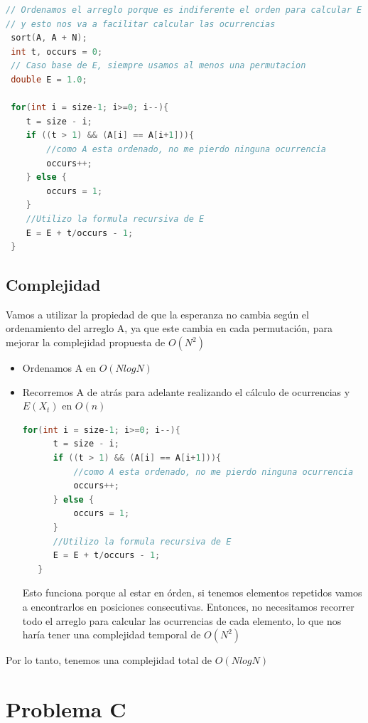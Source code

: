 \documentclass[a4paper]{article}
\begin{document}
\begin{lstlisting}[language=c++]
// Ordenamos el arreglo porque es indiferente el orden para calcular E
// y esto nos va a facilitar calcular las ocurrencias 
 sort(A, A + N); 
 int t, occurs = 0;
 // Caso base de E, siempre usamos al menos una permutacion
 double E = 1.0;
 
 for(int i = size-1; i>=0; i--){
    t = size - i;
    if ((t > 1) && (A[i] == A[i+1])){
        //como A esta ordenado, no me pierdo ninguna ocurrencia
    	occurs++;
    } else {
  	    occurs = 1;
    }
    //Utilizo la formula recursiva de E
    E = E + t/occurs - 1;
 }
\end{lstlisting}
\newpage
\subsection{Complejidad}
Vamos a utilizar la propiedad de que la esperanza no cambia según el ordenamiento del arreglo A, ya que este cambia en cada permutación, para mejorar la complejidad propuesta de $O(N^2)$
\begin{itemize}
\item Ordenamos A en $O(NlogN)$  

\item Recorremos A de atrás para adelante realizando el cálculo de ocurrencias y $E(X_t)$ en $O(n)$
\begin{lstlisting}[language=c++]
   for(int i = size-1; i>=0; i--){
      t = size - i;
      if ((t > 1) && (A[i] == A[i+1])){
          //como A esta ordenado, no me pierdo ninguna ocurrencia
          occurs++;
      } else {
          occurs = 1;
      }
      //Utilizo la formula recursiva de E
      E = E + t/occurs - 1;
   }
\end{lstlisting}
Esto funciona porque al estar en órden, si tenemos elementos repetidos vamos a encontrarlos en posiciones consecutivas. Entonces, no necesitamos recorrer todo el arreglo para calcular las ocurrencias de cada elemento, lo que nos haría tener una complejidad temporal de $O(N^2)$

\end{itemize}
Por lo tanto, tenemos una complejidad total de $O(NlogN)$
                                                        
\newpage
\section{Problema C}
\end{document}
